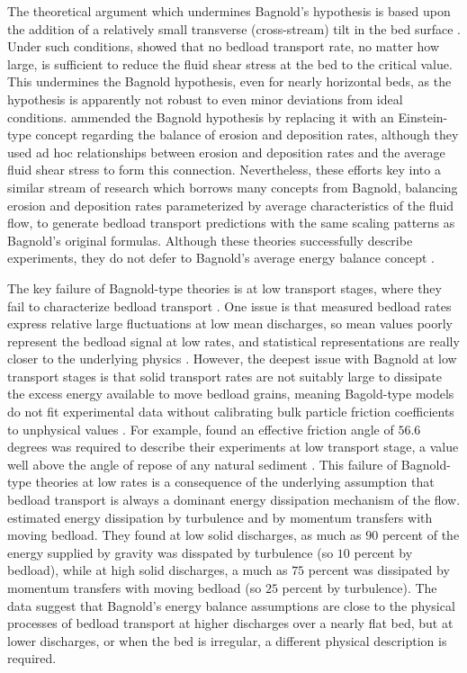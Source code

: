 \documentclass{article}
\begin{document}
The theoretical argument which undermines Bagnold's hypothesis is based upon the addition of a relatively small transverse (cross-stream) tilt in the bed surface \citep{Seminara2002}. 
Under such conditions, \citet{Seminara2002} showed that no bedload transport rate, no matter how large, is sufficient to reduce the fluid shear stress at the bed to the critical value.
This undermines the Bagnold hypothesis, even for nearly horizontal beds, as the hypothesis is apparently not robust to even minor deviations from ideal conditions. 
\citet{Parker2003} ammended the Bagnold hypothesis by replacing it with an Einstein-type concept regarding the balance of erosion and deposition rates, although they used ad hoc relationships between erosion and deposition rates and the average fluid shear stress to form this connection. 
Nevertheless, these efforts key into a similar stream of research which borrows many concepts from Bagnold, balancing erosion and deposition rates parameterized by average characteristics of the fluid flow, to generate bedload transport predictions with the same scaling patterns as Bagnold's original formulas. Although these theories successfully describe experiments, they do not defer to Bagnold's average energy balance concept \citep{Charru2004, Charru2006, Lajenesse2010, Lajenesse2018}. 

The key failure of Bagnold-type theories is at low transport stages, where they fail to characterize bedload transport \citep{Engelund1976, Luque1976, Francis1977, Ancey2008}.
One issue is that measured bedload rates express relative large fluctuations at low mean discharges, so mean values poorly represent the bedload signal at low rates, and statistical representations are really closer to the underlying physics \citep{Ancey2008}.
However, the deepest issue with Bagnold at low transport stages is that solid transport rates are not suitably large to dissipate the excess energy available to move bedload grains, meaning Bagold-type models do not fit experimental data without calibrating bulk particle friction coefficients to unphysical values \citep{Engelund1976, Luque1976, Nelson1995, Nino1998}.
For example, \citet{Nino1998} found an effective friction angle of $56.6$ degrees was required to describe their experiments at low transport stage, a value well above the angle of repose of any natural sediment \citep{Miller1966}.
This failure of Bagnold-type theories at low rates is a consequence of the underlying assumption that bedload transport is always a dominant energy dissipation mechanism of the flow. 
\citet{Ancey2008} estimated energy dissipation by turbulence and by momentum transfers with moving bedload.
They found at low solid discharges, as much as $90$ percent of the energy supplied by gravity was disspated by turbulence (so $10$ percent by bedload), while at high solid discharges, a much as $75$ percent was dissipated by momentum transfers with moving bedload (so $25$ percent by turbulence). 
The data suggest that Bagnold's energy balance assumptions are close to the physical processes of bedload transport at higher discharges over a nearly flat bed, but at lower discharges, or when the bed is irregular, a different physical description is required. 
\end{document}

